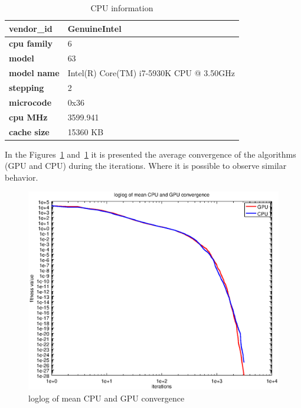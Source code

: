 \documentclass{article}
\begin{document}
    \begin{table}[!htb]
        \centering
        \caption{CPU information}
        \label{tbl:cpuinfo}
        \begin{tabular}{|l|l|}
            \hline
            \textbf{vendor\_id} & GenuineIntel                             \\ \hline
            \textbf{cpu family} & 6                                        \\ \hline
            \textbf{model}      & 63                                       \\ \hline
            \textbf{model name} & Intel(R) Core(TM) i7-5930K CPU @ 3.50GHz \\ \hline
            \textbf{stepping}   & 2                                        \\ \hline
            \textbf{microcode}  & 0x36                                     \\ \hline
            \textbf{cpu MHz}    & 3599.941                                 \\ \hline
            \textbf{cache size} & 15360 KB                                 \\ \hline
        \end{tabular}
    \end{table}

    In the Figures~\ref{fig:loglog_convergence} and~\ref{fig:loglog_convergence} it is presented the average convergence of the algorithms (GPU and CPU) during the iterations. Where it is possible to observe similar behavior.

    \begin{figure}[!htb]
        \centering
        \includegraphics[width=.7\textwidth]{../img/loglog_convergence.eps}
        \caption{loglog of mean CPU and GPU convergence}
        \label{fig:loglog_convergence}
    \end{figure}
\end{document}
